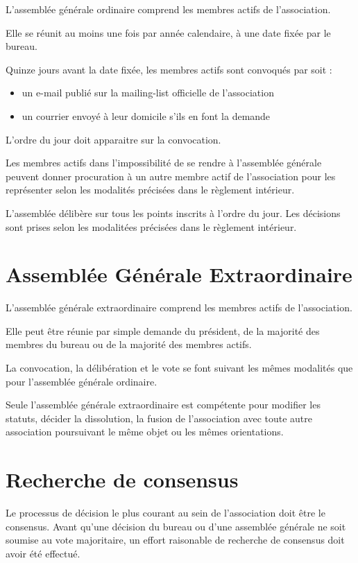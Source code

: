 \documentclass[a4paper, 11pt]{article}
\begin{document}
L'assemblée générale ordinaire comprend les membres actifs de l'association.

Elle se réunit au moins une fois par année calendaire, à une date fixée par le bureau.

Quinze jours avant la date fixée, les membres actifs sont convoqués par soit :

\begin{itemize}
    \item un e-mail publié sur la mailing-list officielle de l'association
    \item un courrier envoyé à leur domicile s'ils en font la demande
\end{itemize}

L'ordre du jour doit apparaitre sur la convocation.

Les membres actifs dans l'impossibilité de se rendre à l'assemblée générale peuvent donner procuration à un autre membre
actif de l'association pour les représenter selon les modalités précisées dans le règlement intérieur.

L'assemblée délibère sur tous les points inscrits à l'ordre du jour. Les décisions sont prises selon les modalitées
précisées dans le règlement intérieur.


\section{Assemblée Générale Extraordinaire} %

L'assemblée générale extraordinaire comprend les membres actifs de l'association.

Elle peut être réunie par simple demande du président, de la majorité des membres du bureau ou de la majorité des
membres actifs.

La convocation, la délibération et le vote se font suivant les mêmes modalités que pour l'assemblée générale ordinaire.

Seule l'assemblée générale extraordinaire est compétente pour modifier les statuts, décider la dissolution, la fusion de
l'association avec toute autre association poursuivant le même objet ou les mêmes orientations.


\section{Recherche de consensus} %

Le processus de décision le plus courant au sein de l'association doit être le consensus. Avant qu'une décision du
bureau ou d'une assemblée générale ne soit soumise au vote majoritaire, un effort raisonable de recherche de consensus
doit avoir été effectué.
\end{document}

